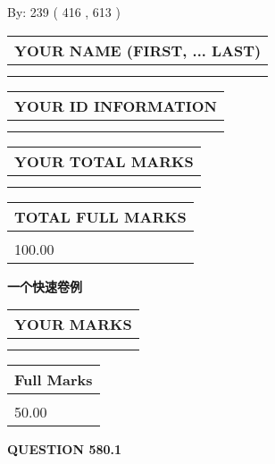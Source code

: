 \documentclass{ctexart}
\begin{document}
   
\hspace{1.0in} By: 
 239 ( 416 ,  613 )
   
   
   
   
\newpage 
\setcounter{page}{ 
   580001 } 
   
   
   
   
\noindent\begin{tabular}{|l|}
\hline
YOUR NAME (FIRST, ... LAST)  \\
\hline
 \\ 
 \\ 
\hline
\end{tabular}
\hspace{0.05in} \begin{tabular}{|l|}
\hline
 YOUR   ID   INFORMATION  \\
\hline
 \\ 
 \\ 
\hline
\end{tabular}
   
   
\vspace{0.2in}\noindent\begin{tabular}{|l|}
\hline
YOUR TOTAL MARKS  \\
\hline
 \\ 
 \\ 
\hline
\end{tabular}
\hspace{0.05in} \begin{tabular}{|l|}
\hline
TOTAL FULL MARKS  \\
\hline
 \\ 
100.00 \\
\hline
\end{tabular}
   
   
 \vspace{0.2in}
{\LARGE {\textbf{ 一个快速卷例}}}
   
   
  
\vspace{0.2in}
  
\noindent\begin{tabular}{|l|}
\hline
 YOUR MARKS  \\
\hline
 \\ 
 \\ 
\hline
\end{tabular}
\hspace{0.05in} \begin{tabular}{|l|}
\hline
 Full Marks  \\
\hline
 \\ 
50.00 \\
\hline
\end{tabular}
{\textbf{\Large{QUESTION
580.1 
}}}
  
\end{document}
